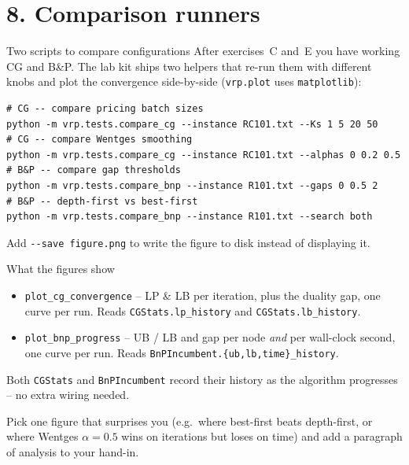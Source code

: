 \documentclass[10pt,aspectratio=169]{beamer}
\begin{document}
\section{8. Comparison runners}

\begin{frame}[fragile]{Two scripts to compare configurations}
  After exercises~C and~E you have working CG and B\&P. The lab kit
  ships two helpers that re-run them with different knobs and plot the
  convergence side-by-side (\texttt{vrp.plot} uses \texttt{matplotlib}):

\begin{lstlisting}[style=sh]
# CG -- compare pricing batch sizes
python -m vrp.tests.compare_cg --instance RC101.txt --Ks 1 5 20 50
# CG -- compare Wentges smoothing
python -m vrp.tests.compare_cg --instance RC101.txt --alphas 0 0.2 0.5
# B&P -- compare gap thresholds
python -m vrp.tests.compare_bnp --instance R101.txt --gaps 0 0.5 2
# B&P -- depth-first vs best-first
python -m vrp.tests.compare_bnp --instance R101.txt --search both
\end{lstlisting}
  Add \texttt{{-}{-}save figure.png} to write the figure to disk instead of
  displaying it.
\end{frame}

\begin{frame}{What the figures show}
  \begin{itemize}\small
    \item \texttt{plot\_cg\_convergence} -- LP \& LB per iteration, plus
          the duality gap, one curve per run. Reads
          \texttt{CGStats.lp\_history} and \texttt{CGStats.lb\_history}.
    \item \texttt{plot\_bnp\_progress} -- UB / LB and gap per node
          \emph{and} per wall-clock second, one curve per run. Reads
          \texttt{BnPIncumbent.\{ub,lb,time\}\_history}.
  \end{itemize}
  Both \texttt{CGStats} and \texttt{BnPIncumbent} record their history
  as the algorithm progresses -- no extra wiring needed.
  \begin{keybox}
    Pick one figure that surprises you (e.g.\ where best-first beats
    depth-first, or where Wentges $\alpha\!=\!0.5$ wins on iterations
    but loses on time) and add a paragraph of analysis to your hand-in.
  \end{keybox}
\end{frame}
\end{document}
